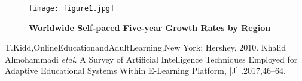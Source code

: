 \documentclass[a4paper,12pt,twocolumn]{article}
\begin{document}
\begin{figure}[htp]
	\centering
	\texttt{[image: figure1.jpg]}
	\caption{\bfseries{ Worldwide Self-paced Five-year Growth Rates by Region}}\label{pic1}
\end{figure}


	\begin{thebibliography}{99}
	  T.Kidd,OnlineEducationandAdultLearning.New York: Hershey, 2010.
	    Khalid Almohammadi \emph{etal.} A Survey of Artificial Intelligence Techniques Employed for  Adaptive Educational Systems Within E-Learning Platform, [J] .2017,46--64.
\end{thebibliography}
\end{document}
